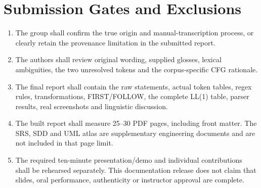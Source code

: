 \documentclass[11pt]{article}
\begin{document}
\section{Submission Gates and Exclusions}
\begin{enumerate}
\item The group shall confirm the true origin and manual-transcription process,
or clearly retain the provenance limitation in the submitted report.
\item The authors shall review original wording, supplied glosses, lexical
ambiguities, the two unresolved tokens and the corpus-specific CFG rationale.
\item The final report shall contain the raw statements, actual token tables,
regex rules, transformations, FIRST/FOLLOW, the complete LL(1) table, parser
results, real screenshots and linguistic discussion.
\item The built report shall measure 25--30 PDF pages, including front matter.
The SRS, SDD and UML atlas are supplementary engineering documents and are
not included in that page limit.
\item The required ten-minute presentation/demo and individual contributions
shall be rehearsed separately. This documentation release does not claim that
slides, oral performance, authenticity or instructor approval are complete.
\end{enumerate}

\end{document}
